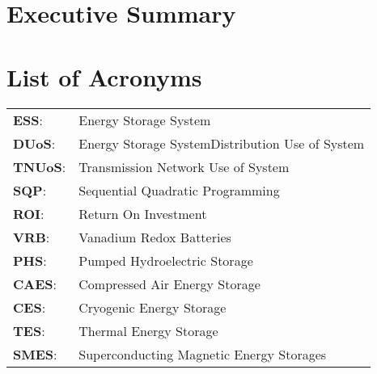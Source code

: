 \documentclass[fontsize=9.5pt]{extarticle}
\begin{document}
\newpage


\section*{Executive Summary}\label{ExecSummary}

\newpage

\tableofcontents


\newpage
{}
\listoffigures
{}
\listoftables
{}
\section*{List of Acronyms}\label{acronyms}
\begin{tabular}{p{1cm}p{12cm}}
\textbf{ESS}:& Energy Storage System \\
\textbf{DUoS}:& Energy Storage SystemDistribution Use of System\\
\textbf{TNUoS}:& Transmission Network Use of System\\
\textbf{SQP}:& Sequential Quadratic Programming\\
\textbf{ROI}:& Return On Investment\\
\textbf{VRB}:& Vanadium Redox Batteries\\
\textbf{PHS}:& Pumped Hydroelectric Storage\\
\textbf{CAES}:& Compressed Air Energy Storage\\
\textbf{CES}:& Cryogenic Energy Storage\\
\textbf{TES}:& Thermal Energy Storage\\
\textbf{SMES}:& Superconducting Magnetic Energy Storages\\
\end{tabular}

\newpage
\end{document}
